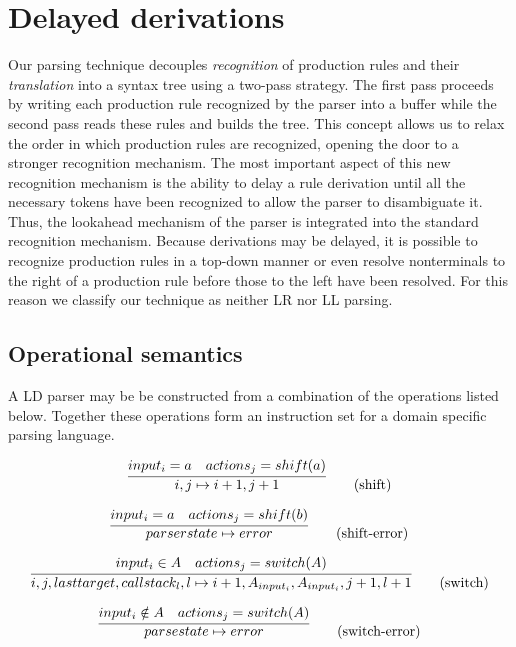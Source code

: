 \documentclass[A4]{sig-alternate}
\begin{document}
\section{Delayed derivations}

Our parsing technique decouples {\em recognition} of production rules and their {\em translation} into a syntax tree using a two-pass strategy.
The first pass proceeds by writing each production rule recognized by the parser into a buffer while the second pass reads these
rules and builds the tree.
This concept allows us to relax the order in which production rules are recognized, opening the door to a stronger recognition mechanism.
The most important aspect of this new recognition mechanism is the ability to delay a rule derivation until all the necessary tokens have been recognized
to allow the parser to disambiguate it.
Thus, the lookahead mechanism of the parser is integrated into the standard recognition mechanism.
Because derivations may be delayed, it is possible to recognize production rules in a top-down manner or even resolve nonterminals to the right of a 
production rule before those to the left have been resolved.
For this reason we classify our technique as neither LR nor LL parsing.

\subsection{Operational semantics}

A LD parser may be be constructed from a combination of the operations listed below.
Together these operations form an instruction set for a domain specific parsing language.

\begin{equation}
\infer{i, j \mapsto i+1, j+1}{input_i = a & actions_j = shift(a)} \tag{shift}
\end{equation}

\begin{equation}
\infer{parserstate \mapsto error}{input_i = a & actions_j = shift(b)} \tag{shift-error}
\end{equation}

\begin{equation}
\infer{i, j, lasttarget, callstack_l, l \mapsto i+1, A_{input_i}, A_{input_i}, j+1, l+1}{input_i \in A & actions_j = switch(A)} \tag{switch}
\end{equation}

\begin{equation}
\infer{parsestate \mapsto error}{input_i \notin A & actions_j = switch(A)} \tag{switch-error}
\end{equation}
\end{document}
